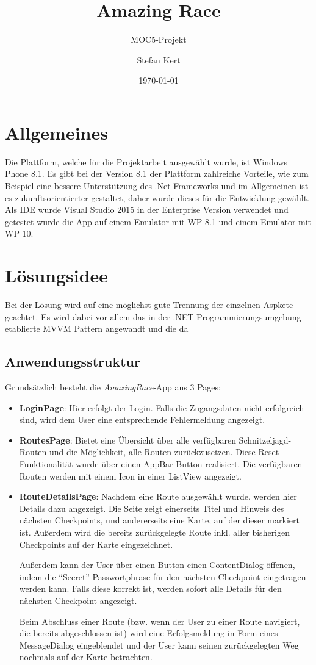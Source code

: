 \documentclass[a4paper,ngerman]{scrartcl}
\begin{document}
\title{Amazing Race}
\subtitle{MOC5-Projekt}
\author{Stefan Kert}
\date{\today}
\maketitle

\section{Allgemeines}
Die Plattform, welche für die Projektarbeit ausgewählt wurde, ist Windows Phone 8.1. Es gibt bei der Version 8.1 der Plattform zahlreiche Vorteile, wie zum Beispiel eine bessere Unterstützung des .Net Frameworks und im Allgemeinen ist es zukunftsorientierter gestaltet, daher wurde dieses für die Entwicklung gewählt. Als IDE wurde Visual Studio 2015 in der Enterprise Version verwendet und getestet wurde die App auf einem Emulator mit WP 8.1 und einem Emulator mit WP 10. 

\section{Lösungsidee}
Bei der Lösung wird auf eine möglichst gute Trennung der einzelnen Aspkete geachtet. Es wird dabei vor allem das in der .NET Programmierungsumgebung etablierte MVVM Pattern angewandt und die da
\subsection{Anwendungsstruktur}
\label{cha:Anwendungsstruktur}
Grundsätzlich besteht die \textit{AmazingRace}-App aus 3 Pages:
\begin{itemize}
	\item \textbf{LoginPage}: Hier erfolgt der Login. Falls die Zugangsdaten nicht erfolgreich sind, wird dem User eine entsprechende Fehlermeldung angezeigt.
	\item \textbf{RoutesPage}: Bietet eine Übersicht über alle verfügbaren Schnitzeljagd-Routen und die Möglichkeit, alle Routen zurückzusetzen. Diese Reset-Funktionalität wurde über einen AppBar-Button realisiert. Die verfügbaren Routen werden mit einem Icon in einer ListView angezeigt.
	\item \textbf{RouteDetailsPage}: Nachdem eine Route ausgewählt wurde, werden hier Details dazu angezeigt. Die Seite zeigt einerseits Titel und Hinweis des nächsten Checkpoints, und andererseits eine Karte, auf der dieser markiert ist. Außerdem wird die bereits zurückgelegte Route inkl. aller bisherigen Checkpoints auf der Karte eingezeichnet.
	
Außerdem kann der User über einen Button einen ContentDialog öffenen, indem die "`Secret"'-Passwortphrase für den nächsten Checkpoint eingetragen werden kann. Falls diese korrekt ist, werden sofort alle Details für den nächsten Checkpoint angezeigt.

Beim Abschluss einer Route (bzw. wenn der User zu einer Route navigiert, die bereits abgeschlossen ist) wird eine Erfolgsmeldung in Form eines MessageDialog eingeblendet und der User kann seinen zurückgelegten Weg nochmals auf der Karte betrachten.
\end{itemize}
\end{document}
